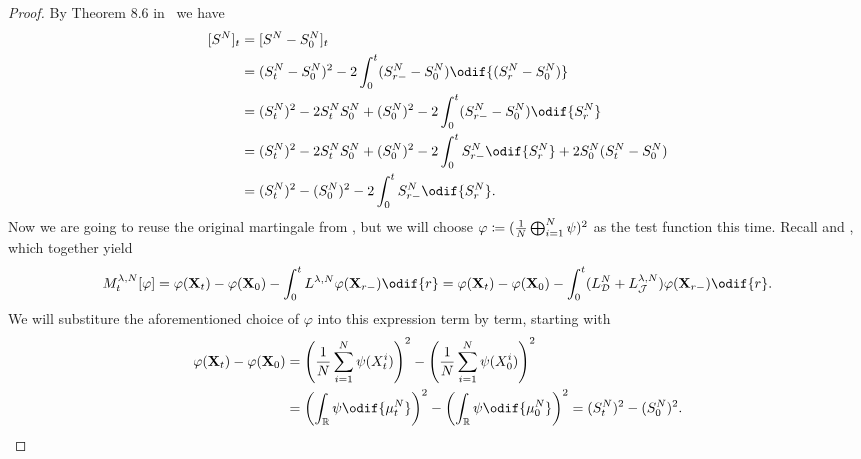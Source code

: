 \begin{proof}
  By Theorem 8.6 in~\cite[221]{klebanerIntroductionStochasticCalculus2012} we have
  \begin{equation}\label{eq:S^2-q-var-rel}
    \begin{split}
      \sbr{S^N}_t & = \sbr{S^N - S_0^N}_t                                                                                \\   %
                  & = (S_t^N - S_0^N)^2 - 2 \int_0^t (S_{r-}^N - S_0^N) \odif{\br{S_r^N - S_0^N}}                        \\
                  & = (S_t^N)^2 - 2 S_t^N S_0^N + (S_0^N)^2 - 2 \int_0^t (S_{r-}^N - S_0^N) \odif{S_r^N}                 \\   %
                  & = (S_t^N)^2 - 2 S_t^N S_0^N + (S_0^N)^2 - 2 \int_0^t S_{r-}^N \odif{S_r^N} + 2 S_0^N (S_t^N - S_0^N) \\
                  & = (S_t^N)^2 - (S_0^N)^2 - 2 \int_0^t S_{r-}^N \odif{S_r^N}.
    \end{split}
  \end{equation}
  Now we are going to reuse the original martingale from , but we will choose \(\varphi \coloneqq \lparen \frac{1}{N} \bigoplus_{i=1}^N \psi \rparen^2\) as the test function this time.
  Recall  and , which together yield
  \begin{equation}
    M_t^{\lambda, N}[\varphi]
    = \varphi(\bm{X}_t) - \varphi(\bm{X}_0) - \int_0^t L^{\lambda, N} \varphi (\bm{X}_{r-}) \odif{r}
    = \varphi(\bm{X}_t) - \varphi(\bm{X}_0) - \int_0^t (L_{\cD}^{N} + L_{\cJ}^{\lambda, N}) \varphi (\bm{X}_{r-}) \odif{r}.
  \end{equation}
  We will substiture the aforementioned choice of \( \varphi \) into this expression term by term, starting with
  \begin{equation}
    \begin{split}
      \varphi(\bm{X}_t) - \varphi(\bm{X}_0)
       & = \br*{\frac{1}{N} \sum_{i=1}^N \psi(X_t^i)}^2 - \br*{\frac{1}{N} \sum_{i=1}^N \psi(X_0^i)}^2 \\
       & = \br*{ \int_\potspace \psi \odif{\mu_t^N} }^2 - \br*{ \int_\potspace \psi \odif{\mu_0^N} }^2
      = (S_t^N)^2 - (S_0^N)^2.
    \end{split}
  \end{equation}


\end{proof}
